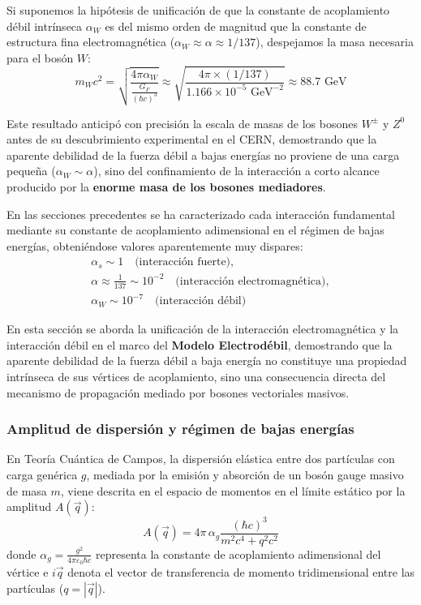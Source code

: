 Si suponemos la hipótesis de unificación de que la constante de acoplamiento débil intrínseca $\alpha_W$ es del mismo orden de magnitud que la constante de estructura fina electromagnética ($\alpha_W \approx \alpha \approx 1/137$), despejamos la masa necesaria para el bosón $W$:
\begin{equation}
    m_W c^2 = \sqrt{\frac{4\pi \alpha_W}{\frac{G_F}{(\hbar c)^3}}} \approx \sqrt{\frac{4\pi \times (1/137)}{1.166 \times 10^{-5}\text{ GeV}^{-2}}} \approx 88.7\text{ GeV}
\end{equation}

Este resultado anticipó con precisión la escala de masas de los bosones $W^\pm$ y $Z^0$ antes de su descubrimiento experimental en el CERN, demostrando que la aparente debilidad de la fuerza débil a bajas energías no proviene de una carga pequeña ($\alpha_W \sim \alpha$), sino del confinamiento de la interacción a corto alcance producido por la \textbf{enorme masa de los bosones mediadores}.

En las secciones precedentes se ha caracterizado cada interacción fundamental mediante su constante de acoplamiento adimensional en el régimen de bajas energías, obteniéndose valores aparentemente muy dispares:
\[
\begin{array}{l}
    \displaystyle \alpha_s \sim 1 \quad \text{(interacción fuerte)}, \\[4pt]
    \displaystyle \alpha \approx \frac{1}{137} \sim 10^{-2} \quad \text{(interacción electromagnética)}, \\[4pt]
    \displaystyle \alpha_W \sim 10^{-7} \quad \text{(interacción débil)}
\end{array}
\]

En esta sección se aborda la unificación de la interacción electromagnética y la interacción débil en el marco del \textbf{Modelo Electrodébil}, demostrando que la aparente debilidad de la fuerza débil a baja energía no constituye una propiedad intrínseca de sus vértices de acoplamiento, sino una consecuencia directa del mecanismo de propagación mediado por bosones vectoriales masivos.

\subsubsection{Amplitud de dispersión y régimen de bajas energías}

En Teoría Cuántica de Campos, la dispersión elástica entre dos partículas con carga genérica $g$, mediada por la emisión y absorción de un bosón gauge masivo de masa $m$, viene descrita en el espacio de momentos en el límite estático por la amplitud $A(\vec{q})$:
\begin{equation}
    A(\vec{q}) = 4\pi \, \alpha_g \frac{(\hbar c)^3}{m^2 c^4 + q^2 c^2}
\end{equation}
donde $\alpha_g = \frac{g^2}{4\pi \varepsilon_0 \hbar c}$ representa la constante de acoplamiento adimensional del vértice e $i\vec{q}$ denota el vector de transferencia de momento tridimensional entre las partículas ($q = |\vec{q}|$).


